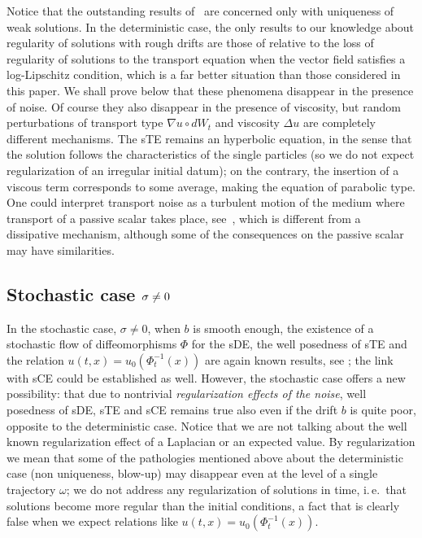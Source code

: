 \documentclass[a4paper,10pt]{article}
\begin{document}
Notice that the outstanding results of~\cite{DIPELI89,AMBROSIO04}
are concerned only with uniqueness of weak solutions. In the deterministic case,  the only results to our knowledge about regularity of solutions with rough drifts are those of \cite[Section~3.3]{BahCheDan} relative to the loss of regularity of solutions to the transport equation when the vector field satisfies a log-Lipschitz condition, which is a far better situation than those considered in this paper. We shall prove below that these phenomena disappear in the presence
of noise. Of course they also disappear in the presence of viscosity, but
random perturbations of transport type $\nabla u\circ dW_{t}$ and viscosity 
$\Delta u$ are completely different mechanisms. The sTE remains an hyperbolic
equation, in the sense that the solution follows the characteristics of the
single particles (so we do not expect regularization of an irregular initial
datum); on the contrary, the insertion of a viscous term corresponds to some
average, making the equation of parabolic type. One could interpret
transport noise as a turbulent motion of the medium where transport of a
passive scalar takes place, see~\cite{GaKuVe}, which is different from a
dissipative mechanism, although some of the consequences on the passive
scalar may have similarities.

\subsection{Stochastic case $\protect\sigma\neq0$}

In the stochastic case, $\sigma\neq0$, when $b$ is smooth enough, the
existence of a stochastic flow of diffeomorphisms $\Phi$ for the sDE, the
well posedness of sTE and the relation $u(t,x) =u_{0}(\Phi
_{t}^{-1}(x) )$ are again known results, 
see \cite{KUNITA84a,KUNITA84,KUNITA90}; the link 
with sCE could be established as well. 
However, the stochastic case offers a new possibility: that due to
nontrivial \textit{regularization effects of the noise}, well posedness of
sDE, sTE and sCE remains true also even if the drift $b$ is quite poor,
opposite to the deterministic case. Notice that we are not talking about the
well known regularization effect of a Laplacian or an expected value. By
regularization we mean that some of the pathologies mentioned above
about the deterministic case (non uniqueness, blow-up) may disappear even at
the level of a single trajectory $\omega$; we do not address any
regularization of solutions in time, i.\,e.\ that solutions become more regular
than the initial conditions, a fact that is clearly false when we expect
relations like $u(t,x) =u_{0}(\Phi_{t}^{-1}(x)
)$. 
\end{document}

